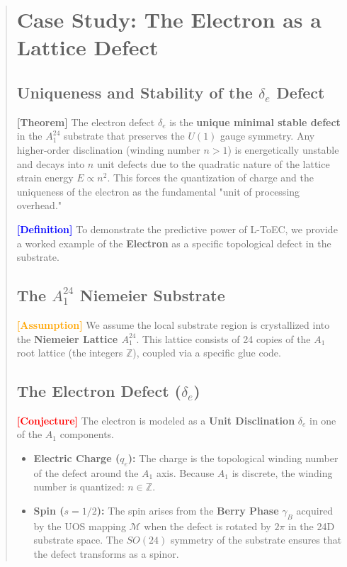 \documentclass[11pt,titlepage]{article}
\newcommand{\tagdef}{\textcolor{blue}{\textbf{[Definition]}} }
\newcommand{\tagass}{\textcolor{orange}{\textbf{[Assumption]}} }
\newcommand{\tagtheo}{\textcolor{green!60!black}{\textbf{[Theorem]}} }
\newcommand{\tagconj}{\textcolor{red}{\textbf{[Conjecture]}} }
\begin{document}
\begin{abstract}
\section{Case Study: The Electron as a Lattice Defect}
\subsection{Uniqueness and Stability of the $\delta_e$ Defect}
\tagtheo The electron defect $\delta_e$ is the \textbf{unique minimal stable defect} in the $A_1^{24}$ substrate that preserves the $U(1)$ gauge symmetry. Any higher-order disclination (winding number $n > 1$) is energetically unstable and decays into $n$ unit defects due to the quadratic nature of the lattice strain energy $E \propto n^2$. This forces the quantization of charge and the uniqueness of the electron as the fundamental "unit of processing overhead."

\label{sec:electron_case_study}
\tagdef To demonstrate the predictive power of L-ToEC, we provide a worked example of the \textbf{Electron} as a specific topological defect in the substrate.

\subsection{The $A_1^{24}$ Niemeier Substrate}
\tagass We assume the local substrate region is crystallized into the \textbf{Niemeier Lattice $A_1^{24}$}. This lattice consists of 24 copies of the $A_1$ root lattice (the integers $\mathbb{Z}$), coupled via a specific glue code.

\subsection{The Electron Defect ($\delta_e$)}
\tagconj The electron is modeled as a \textbf{Unit Disclination} $\delta_e$ in one of the $A_1$ components. 
\begin{itemize}
    
\item \textbf{Electric Charge ($q_e$):} The charge is the topological winding number of the defect around the $A_1$ axis. Because $A_1$ is discrete, the winding number is quantized: $n \in \mathbb{Z}$.
    
\item \textbf{Spin ($s=1/2$):} The spin arises from the \textbf{Berry Phase} $\gamma_B$ acquired by the UOS mapping $\mathcal{M}$ when the defect is rotated by $2\pi$ in the 24D substrate space. The $SO(24)$ symmetry of the substrate ensures that the defect transforms as a spinor.
    

\end{itemize}
\end{abstract}
\end{document}

